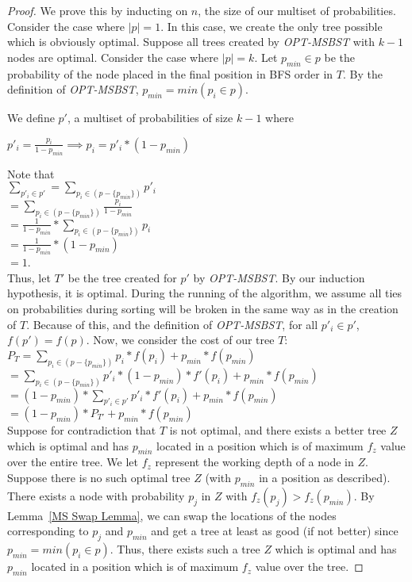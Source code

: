 \documentclass[letterpaper,12pt,titlepage,oneside,final]{book}
\theoremstyle{plain}
\begin{document}
\begin{proof}
We prove this by inducting on $n$, the size of our multiset of probabilities. Consider the case where $|p| = 1$. In this case, we create the only tree possible which is obviously optimal. Suppose all trees created by \textit{OPT-MSBST} with $k-1$ nodes are optimal. Consider the case where $|p|=k$. Let $p_{min} \in p$ be the probability of the node placed in the final position in BFS order in $T$. By the definition of \textit{OPT-MSBST}, $p_{min}=min(p_i \in p)$.

 We define $p'$, a multiset of probabilities of size $k-1$ where
\begin{center}
$p'_i=\frac{p_i}{1-p_{min}} \implies p_i = p'_i*(1-p_{min})$
\end{center}

Note that \\
$\sum\limits_{p'_i \in p'} = \sum_{p_i \in (p - \{p_{min}\})}p'_i$\\
$ = \sum_{p_i \in (p - \{p_{min}\})}\frac{p_i}{1-p_{min}}$\\
$ = \frac{1}{1-p_{min}}*\sum_{p_i \in (p - \{p_{min}\})}p_i$\\
$ = \frac{1}{1-p_{min}}*(1-p_{min})$\\
$= 1$. \\

Thus, let $T'$ be the tree created for $p'$ by \textit{OPT-MSBST}. By our induction hypothesis, it is optimal. During the running of the algorithm, we assume all ties on probabilities during sorting will be broken in the same way as in the creation of $T$. Because of this, and the definition of \textit{OPT-MSBST}, for all $p'_i \in p'$, $f(p')=f(p)$. Now, we consider the cost of our tree $T$: \\

$P_T = \sum_{p_i \in (p - \{p_{min}\})} p_i*f(p_i) + p_{min}*f(p_{min})$ \\
$= \sum_{p_i \in (p - \{p_{min}\})} p'_i*(1-p_{min})*f'(p_i) + p_{min}*f(p_{min})$ \\
$= (1-p_{min})*\sum_{p'_i \in p'} p'_i*f'(p_i) + p_{min}*f(p_{min})$ \\
$= (1-p_{min})*P_{T'} + p_{min}*f(p_{min})$ \\

Suppose for contradiction that $T$ is not optimal, and there exists a better tree $Z$ which is optimal and has $p_{min}$ located in a position which is of maximum $f_z$ value over the entire tree. We let $f_z$ represent the working depth of a node in $Z$. Suppose there is no such optimal tree $Z$ (with $p_{min}$ in a position as described). There exists a node with probability $p_j$ in $Z$ with $f_z(p_j) > f_z(p_{min})$. By Lemma~\ref{MS Swap Lemma}, we can swap the locations of the nodes corresponding to $p_j$ and $p_{min}$ and get a tree at least as good (if not better) since $p_{min}=min(p_i \in p)$. Thus, there exists such a tree $Z$ which is optimal and has $p_{min}$ located in a position which is of maximum $f_z$ value over the tree.


\end{proof}
\end{document}
